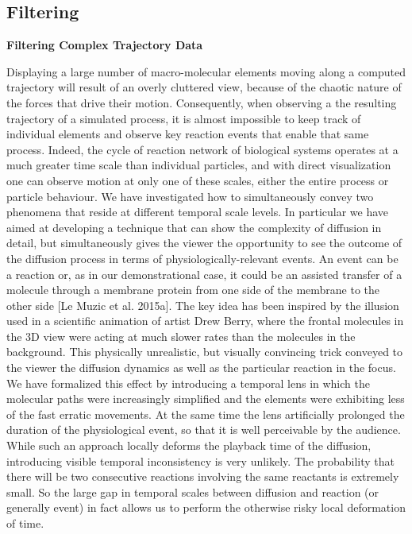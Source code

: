 \subsection{Filtering}

\textbf{Filtering Complex Trajectory Data}

Displaying a large number of macro-molecular elements moving along a computed trajectory will result of an overly cluttered view, because of the chaotic nature of the forces that drive their motion.
Consequently, when observing a the resulting trajectory of a simulated process, it is almost impossible to keep track of individual elements and observe key reaction events that enable that same process. 
Indeed, the cycle of reaction network of biological systems operates at a much greater time scale than individual particles, and with direct visualization one can observe motion at only one of these scales, either the entire process or particle behaviour.
We have investigated how to simultaneously convey two phenomena that reside at different temporal scale levels. 
In particular we have aimed at developing a technique that can show the complexity of diffusion in detail, but simultaneously gives the viewer the opportunity to see the outcome of the diffusion process in terms of physiologically-relevant events.
An event can be a reaction or, as in our demonstrational case, it could be an assisted transfer of a molecule through a membrane protein from one side of the membrane to the other side [Le Muzic et al. 2015a]. 
The key idea has been inspired by the illusion used in a scientific animation of artist Drew Berry, where the frontal molecules in the 3D view were acting at much slower rates than the molecules in the background. 
This physically unrealistic, but visually convincing trick conveyed to the viewer the diffusion dynamics as well as the particular reaction in the focus. 
We have formalized this effect by introducing a temporal lens in which the molecular paths were increasingly simplified and the elements were exhibiting less of the fast erratic movements. 
At the same time the lens artificially prolonged the duration of the physiological event, so that it is well perceivable by the audience. 
While such an approach locally deforms the playback time of the diffusion, introducing visible temporal inconsistency is very unlikely. 
The probability that there will be two consecutive reactions involving the same reactants is extremely small. 
So the large gap in temporal scales between diffusion and reaction (or generally event) in fact allows us to perform the otherwise risky local deformation of time.

